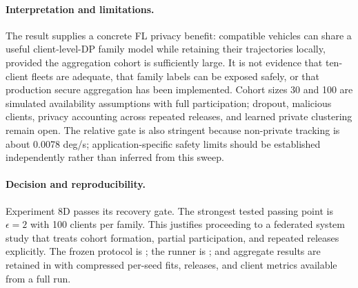 \paragraph{Interpretation and limitations.}
The result supplies a concrete FL privacy benefit: compatible vehicles can
share a useful client-level-DP family model while retaining their trajectories
locally, provided the aggregation cohort is sufficiently large. It is not
evidence that ten-client fleets are adequate, that family labels can be exposed
safely, or that production secure aggregation has been implemented. Cohort
sizes 30 and 100 are simulated availability assumptions with full participation;
dropout, malicious clients, privacy accounting across repeated releases, and
learned private clustering remain open. The relative gate is also stringent
because non-private tracking is about 0.0078 deg/s; application-specific safety
limits should be established independently rather than inferred from this sweep.

\paragraph{Decision and reproducibility.}
Experiment 8D passes its recovery gate. The strongest tested passing point is
$\epsilon=2$ with 100 clients per family. This justifies proceeding to a
federated system study that treats cohort formation, partial participation, and
repeated releases explicitly. The frozen protocol is
; the runner is
; and aggregate results
are retained in  with compressed
per-seed fits, releases, and client metrics available from a full run.
